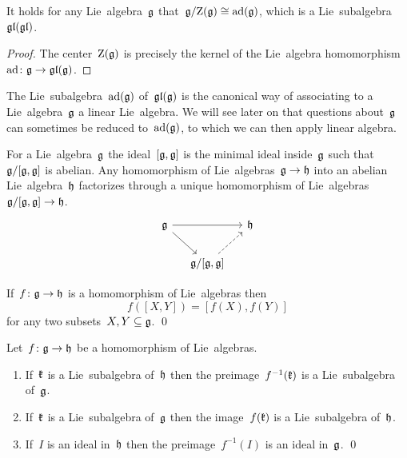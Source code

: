 \begin{corollary}
  It holds for any Lie~algebra~$\mathfrak{g}$ that~$\mathfrak{g}/{\operatorname{Z}(\mathfrak{g})} \cong \operatorname{ad}(\mathfrak{g})$, which is a Lie~subalgebra~$\mathfrak{gl}(\mathfrak{gl})$.
\end{corollary}


\begin{proof}
  The center~$\operatorname{Z}(\mathfrak{g})$ is precisely the kernel of the Lie~algebra homomorphism~$\operatorname{ad} \colon \mathfrak{g} \to \mathfrak{gl}(\mathfrak{g})$.
\end{proof}


\begin{remark}
  The Lie~subalgebra~$\operatorname{ad}(\mathfrak{g})$ of~$\mathfrak{gl}(\mathfrak{g})$ is the canonical way of associating to a Lie~algebra~$\mathfrak{g}$ a linear Lie~algebra.
  We will see later on that questions about~$\mathfrak{g}$ can sometimes be reduced to~$\operatorname{ad}(\mathfrak{g})$, to which we can then apply linear algebra.
\end{remark}


\begin{remark}
  For a Lie~algebra~$\mathfrak{g}$ the ideal~$[\mathfrak{g},\mathfrak{g}]$ is the minimal ideal inside~$\mathfrak{g}$ such that~$\mathfrak{g}/[\mathfrak{g},\mathfrak{g}]$ is abelian.
  Any homomorphism of Lie~algebras~$\mathfrak{g} \to \mathfrak{h}$ into an abelian Lie~algebra~$\mathfrak{h}$ factorizes through a unique homomorphism of Lie~algebras~$\mathfrak{g}/[\mathfrak{g}, \mathfrak{g}] \to \mathfrak{h}$.
  \[
    \begin{tikzcd}[column sep = small]
      \glie
      \arrow{rr}
      \arrow{dr}
      &
      {}
      &
      \hlie
      \\
      {}
      &
      \glie/[\glie,\glie]
      \arrow[dashed]{ur}
      &
      {}
    \end{tikzcd}
  \]
\end{remark}


\begin{lemma}
  \label{homomorphisms respect commutators of sets}
  If~$f \colon \mathfrak{g} \to \mathfrak{h}$ is a homomorphism of Lie~algebras then
  \[
    f([X,Y])
    =
    [f(X), f(Y)]
  \]
  for any two subsets~$X, Y \subseteq \mathfrak{g}$.
  \qed
\end{lemma}


\begin{lemma}
  Let~$f \colon \mathfrak{g} \to \mathfrak{h}$ be a homomorphism of Lie~algebras.
  \begin{enumerate}
    \item
      If~$\mathfrak{k}$ is a Lie~subalgebra of~$\mathfrak{h}$ then the preimage~$f^{-1}(\mathfrak{k})$ is a Lie~subalgebra of~$\mathfrak{g}$.
    \item
      If~$\mathfrak{k}$ is a Lie~subalgebra of~$\mathfrak{g}$ then the image~$f(\mathfrak{k})$ is a Lie~subalgebra of~$\mathfrak{h}$.
    \item
      If~$I$ is an ideal in~$\mathfrak{h}$ then the preimage~$f^{-1}(I)$ is an ideal in~$\mathfrak{g}$.
    \qed
  \end{enumerate}
\end{lemma}


